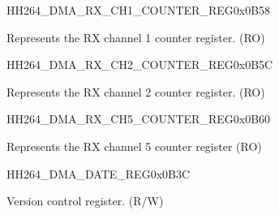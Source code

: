 \begin{register}{H}{H264\_DMA\_RX\_CH1\_COUNTER\_REG}{0x0B58}\label{regdesc:H264DMARXCH1COUNTERREG}
%
%
\regnewline%
\begin{regdesc}\begin{reglist}
\label{fielddesc:H264DMARXCH1CNT}\item [H264\_DMA\_RX\_CH1\_CNT] Represents the RX channel 1 counter register. (RO)
\end{reglist}\end{regdesc}
\end{register}


\begin{register}{H}{H264\_DMA\_RX\_CH2\_COUNTER\_REG}{0x0B5C}\label{regdesc:H264DMARXCH2COUNTERREG}
%
%
\regnewline%
\begin{regdesc}\begin{reglist}
\label{fielddesc:H264DMARXCH2CNT}\item [H264\_DMA\_RX\_CH2\_CNT] Represents the RX channel 2 counter register. (RO)
\end{reglist}\end{regdesc}
\end{register}


\begin{register}{H}{H264\_DMA\_RX\_CH5\_COUNTER\_REG}{0x0B60}\label{regdesc:H264DMARXCH5COUNTERREG}
%
%
\regnewline%
\begin{regdesc}\begin{reglist}
\label{fielddesc:H264DMARXCH5CNT}\item [H264\_DMA\_RX\_CH5\_CNT] Represents the RX channel 5 counter register (RO)
\end{reglist}\end{regdesc}
\end{register}

\begin{register}{H}{H264\_DMA\_DATE\_REG}{0x0B3C}\label{regdesc:H264DMADATEREG}
%
\regnewline%
\begin{regdesc}\begin{reglist}
\label{fielddesc:H264DMADATE}\item [H264\_DMA\_DATE] Version control register. (R/W)
\end{reglist}\end{regdesc}
\end{register}
